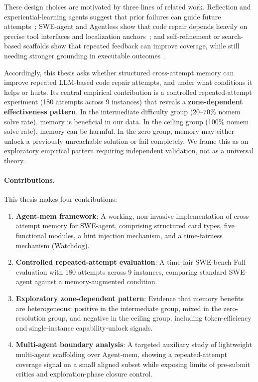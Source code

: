 \documentclass[runningheads]{llncs}
\begin{document}
These design choices are motivated by three lines of related work. Reflection and experiential-learning agents suggest that prior failures can guide future attempts~\cite{shinn2023reflexion,zhao2024expel}; SWE-agent and Agentless show that code repair depends heavily on precise tool interfaces and localization anchors~\cite{yang2024sweagent,xia2024agentless}; and self-refinement or search-based scaffolds show that repeated feedback can improve coverage, while still needing stronger grounding in executable outcomes~\cite{madaan2023selfrefine,zhou2023lats}.

Accordingly, this thesis asks whether structured cross-attempt memory can improve repeated LLM-based code repair attempts, and under what conditions it helps or hurts. Its central empirical contribution is a controlled repeated-attempt experiment (180 attempts across 9 instances) that reveals a \textbf{zone-dependent effectiveness pattern}. In the intermediate difficulty group (20--70\% nomem solve rate), memory is beneficial in our data. In the ceiling group (100\% nomem solve rate), memory can be harmful. In the zero group, memory may either unlock a previously unreachable solution or fail completely. We frame this as an exploratory empirical pattern requiring independent validation, not as a universal theory.

\paragraph{Contributions.} This thesis makes four contributions:
\begin{enumerate}
    \item \textbf{Agent-mem framework}: A working, non-invasive implementation of cross-attempt memory for SWE-agent, comprising structured card types, five functional modules, a hint injection mechanism, and a time-fairness mechanism (Watchdog).
    \item \textbf{Controlled repeated-attempt evaluation}: A time-fair SWE-bench Full evaluation with 180 attempts across 9 instances, comparing standard SWE-agent against a memory-augmented condition.
    \item \textbf{Exploratory zone-dependent pattern}: Evidence that memory benefits are heterogeneous: positive in the intermediate group, mixed in the zero-resolution group, and negative in the ceiling group, including token-efficiency and single-instance capability-unlock signals.
    \item \textbf{Multi-agent boundary analysis}: A targeted auxiliary study of lightweight multi-agent scaffolding over Agent-mem, showing a repeated-attempt coverage signal on a small aligned subset while exposing limits of pre-submit critics and exploration-phase closure control.
\end{enumerate}
\end{document}
